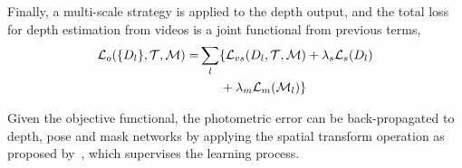 
Finally, a multi-scale strategy is applied to the depth output, and the total loss for depth estimation from videos is a joint functional from previous terms,
\begin{align}
\label{eqn:full}
{\mathcal L}_{o}(\{D_l\}, {\mathcal T}, {\mathcal M}) =& \sum_l\{{\mathcal L}_{vs}(D_l,{\mathcal T},{\mathcal M}) + \lambda_s{\mathcal L}_{s}(D_l) \nonumber\\
&\text{~~~~~} + \lambda_m{\mathcal L}_{m}({\mathcal M}_l)\}
\end{align}

Given the objective functional, the photometric error can be back-propagated to depth, pose and mask networks by applying the spatial transform operation as proposed by~\cite{jaderberg2015spatial}, which supervises the learning process.



